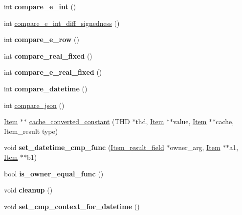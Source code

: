 \begin{DoxyCompactItemize}
\mbox{\label{classArg__comparator_a020dc96b7ec7ddd769125f158075db32}} 
int {\bfseries compare\+\_\+e\+\_\+int} ()
\item 
int \mbox{\hyperlink{classArg__comparator_a440b28c1147a8c8491428e1f5c44e681}{compare\+\_\+e\+\_\+int\+\_\+diff\+\_\+signedness}} ()
\item 
\mbox{\label{classArg__comparator_a3f4d492b7ac04d2e544823e4529e9948}} 
int {\bfseries compare\+\_\+e\+\_\+row} ()
\item 
\mbox{\label{classArg__comparator_ada10fe6293019038a158b3dc7debec59}} 
int {\bfseries compare\+\_\+real\+\_\+fixed} ()
\item 
\mbox{\label{classArg__comparator_a00ccca88667ce0c53e6291365d2d83f4}} 
int {\bfseries compare\+\_\+e\+\_\+real\+\_\+fixed} ()
\item 
\mbox{\label{classArg__comparator_a61e004c985a05f2d9b2d0846e4685b87}} 
int {\bfseries compare\+\_\+datetime} ()
\item 
int \mbox{\hyperlink{classArg__comparator_abfac0e9b52332d82c653241793fac38d}{compare\+\_\+json}} ()
\item 
\mbox{\hyperlink{classItem}{Item}} $\ast$$\ast$ \mbox{\hyperlink{classArg__comparator_a435c8c093fc3511a98a20c4f9783ccb5}{cache\+\_\+converted\+\_\+constant}} (T\+HD $\ast$thd, \mbox{\hyperlink{classItem}{Item}} $\ast$$\ast$value, \mbox{\hyperlink{classItem}{Item}} $\ast$$\ast$cache, Item\+\_\+result type)
\item 
\mbox{\label{classArg__comparator_a35c93363afd999178620f7161c970d00}} 
void {\bfseries set\+\_\+datetime\+\_\+cmp\+\_\+func} (\mbox{\hyperlink{classItem__result__field}{Item\+\_\+result\+\_\+field}} $\ast$owner\+\_\+arg, \mbox{\hyperlink{classItem}{Item}} $\ast$$\ast$a1, \mbox{\hyperlink{classItem}{Item}} $\ast$$\ast$b1)
\item 
\mbox{\label{classArg__comparator_abfafa70c4bb7d08bdf475fcf84ef3a6a}} 
bool {\bfseries is\+\_\+owner\+\_\+equal\+\_\+func} ()
\item 
\mbox{\label{classArg__comparator_a135f98b2dd315ec9725e2b4bdadb130d}} 
void {\bfseries cleanup} ()
\item 
\mbox{\label{classArg__comparator_a8fdc2204c1080a9ef883fc35a471fcc6}} 
void {\bfseries set\+\_\+cmp\+\_\+context\+\_\+for\+\_\+datetime} ()
\end{DoxyCompactItemize}

